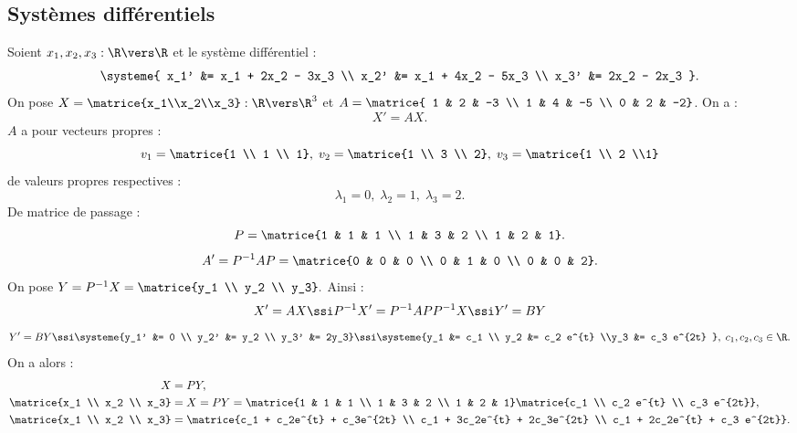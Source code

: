 \documentclass{mybourbaki}
\begin{document}
\subsection{Systèmes différentiels}
Soient $x_1,x_2,x_3 : \R \vers \R$ et le système différentiel : \[ \systeme{ 
x_1' &= x_1 + 2x_2 - 3x_3 \\
x_2' &= x_1 + 4x_2 - 5x_3 \\
x_3' &= 2x_2 - 2x_3
}.\] 
On pose $X = \matrice{x_1\\x_2\\x_3} : \R \vers \R^{3}$ et $A = \matrice{ 1  & 2 & -3 \\ 1 & 4 & -5 \\ 0 & 2 & -2}$. On a : \[ X' = AX. \]
$A$ a pour vecteurs propres : \[ v_1 = \matrice{1 \\ 1 \\ 1}, \; v_2 = \matrice{1 \\ 3 \\ 2}, \; v_3 = \matrice{1 \\ 2 \\1}\] de valeurs propres respectives : \[\lambda_1 = 0, \; \lambda_2 = 1 , \; \lambda_3 = 2. \]De matrice de passage : \[ P = \matrice{1 & 1 & 1 \\ 1 & 3 & 2 \\ 1 & 2 & 1}. \] \[A' = P^{-1}AP = \matrice{0 & 0 & 0 \\ 0 & 1 & 0 \\ 0 & 0 & 2}. \] On pose $Y = P^{-1}X = \matrice{y_1 \\ y_2 \\ y_3}.$ Ainsi :\[ X' = AX \ssi P^{-1}X' = P^{-1}APP^{-1}X \ssi Y' = BY\] \[ Y' = BY \ssi \systeme{y_1' &= 0 \\ y_2' &= y_2 \\ y_3' &= 2y_3} \ssi \systeme{y_1 &= c_1 \\ y_2 &= c_2 e^{t} \\y_3 &= c_3 e^{2t} }, \; c_1,c_2,c_3 \in \R.\]On a alors : 
\begin{align*}
X &= PY, \\
\matrice{x_1 \\ x_2 \\ x_3} &= X = PY = \matrice{1 & 1 & 1 \\ 1 & 3 & 2 \\ 1 & 2 & 1}\matrice{c_1 \\ c_2 e^{t} \\ c_3 e^{2t}}, \\
\matrice{x_1 \\ x_2 \\ x_3} &= \matrice{c_1 + c_2e^{t} + c_3e^{2t} \\ c_1 + 3c_2e^{t} + 2c_3e^{2t} \\ c_1 + 2c_2e^{t} + c_3 e^{2t}}.
\end{align*}
\end{document}
